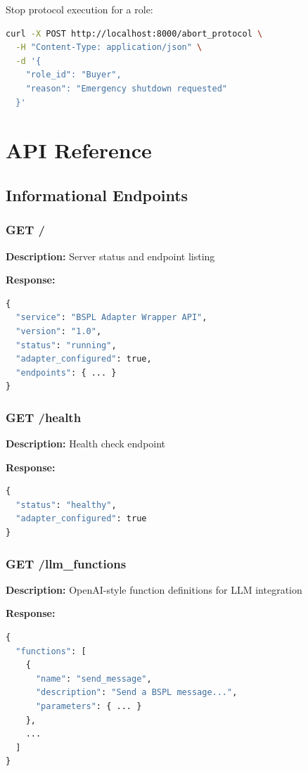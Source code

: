 \documentclass[11pt,a4paper]{article}
\begin{document}
Stop protocol execution for a role:

\begin{lstlisting}[language=bash]
curl -X POST http://localhost:8000/abort_protocol \
  -H "Content-Type: application/json" \
  -d '{
    "role_id": "Buyer",
    "reason": "Emergency shutdown requested"
  }'
\end{lstlisting}

\section{API Reference}

\subsection{Informational Endpoints}

\subsubsection{GET /}
\textbf{Description:} Server status and endpoint listing

\textbf{Response:}
\begin{lstlisting}[language=python]
{
  "service": "BSPL Adapter Wrapper API",
  "version": "1.0",
  "status": "running",
  "adapter_configured": true,
  "endpoints": { ... }
}
\end{lstlisting}

\subsubsection{GET /health}
\textbf{Description:} Health check endpoint

\textbf{Response:}
\begin{lstlisting}[language=python]
{
  "status": "healthy",
  "adapter_configured": true
}
\end{lstlisting}

\subsubsection{GET /llm\_functions}
\textbf{Description:} OpenAI-style function definitions for LLM integration

\textbf{Response:}
\begin{lstlisting}[language=python]
{
  "functions": [
    {
      "name": "send_message",
      "description": "Send a BSPL message...",
      "parameters": { ... }
    },
    ...
  ]
}
\end{lstlisting}
\end{document}
